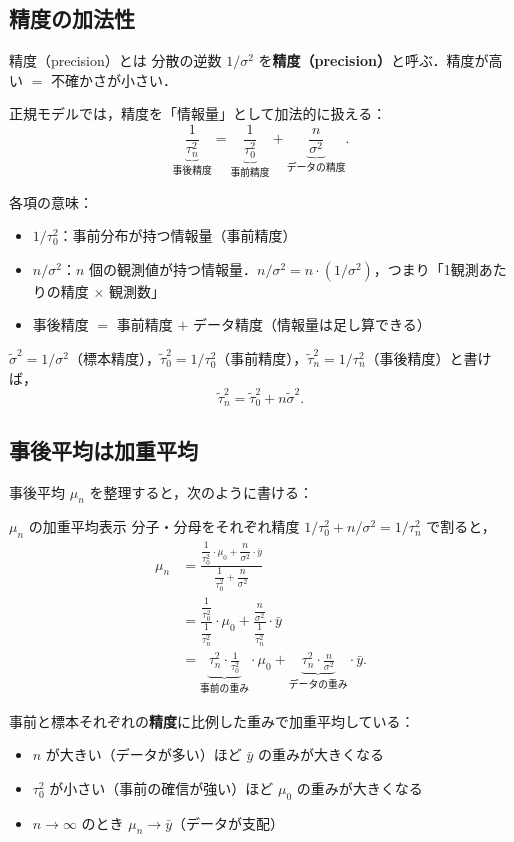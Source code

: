 \documentclass[lualatex,ja=standard,a4paper,12pt]{bxjsarticle}
\begin{document}
\subsection{精度の加法性}

\begin{derivbox}{精度（precision）とは}
分散の逆数 $1/\sigma^2$ を\textbf{精度（precision）}と呼ぶ．精度が高い $=$ 不確かさが小さい．

正規モデルでは，精度を「情報量」として加法的に扱える：
\[
  \underbrace{\frac{1}{\tau_n^2}}_{\text{事後精度}}
  = \underbrace{\frac{1}{\tau_0^2}}_{\text{事前精度}}
  + \underbrace{\frac{n}{\sigma^2}}_{\text{データの精度}}.
\]

各項の意味：
\begin{itemize}
  \item $1/\tau_0^2$：事前分布が持つ情報量（事前精度）
  \item $n/\sigma^2$：$n$ 個の観測値が持つ情報量．$n/\sigma^2 = n \cdot (1/\sigma^2)$，つまり「1観測あたりの精度 $\times$ 観測数」
  \item 事後精度 $=$ 事前精度 $+$ データ精度（情報量は足し算できる）
\end{itemize}

$\tilde{\sigma}^2 = 1/\sigma^2$（標本精度），$\tilde{\tau}_0^2 = 1/\tau_0^2$（事前精度），$\tilde{\tau}_n^2 = 1/\tau_n^2$（事後精度）と書けば，
\[
  \tilde{\tau}_n^2 = \tilde{\tau}_0^2 + n\tilde{\sigma}^2.
\]
\end{derivbox}

\subsection{事後平均は加重平均}

事後平均 $\mu_n$ を整理すると，次のように書ける：

\begin{derivbox}{$\mu_n$ の加重平均表示}
分子・分母をそれぞれ精度 $1/\tau_0^2 + n/\sigma^2 = 1/\tau_n^2$ で割ると，
\begin{align*}
  \mu_n
  &= \frac{\dfrac{1}{\tau_0^2} \cdot \mu_0 + \dfrac{n}{\sigma^2} \cdot \bar{y}}
         {\dfrac{1}{\tau_0^2} + \dfrac{n}{\sigma^2}} \\[6pt]
  &= \frac{\dfrac{1}{\tau_0^2}}{\dfrac{1}{\tau_n^2}} \cdot \mu_0
   + \frac{\dfrac{n}{\sigma^2}}{\dfrac{1}{\tau_n^2}} \cdot \bar{y} \\[6pt]
  &= \underbrace{\tau_n^2 \cdot \frac{1}{\tau_0^2}}_{\text{事前の重み}} \cdot \mu_0
   + \underbrace{\tau_n^2 \cdot \frac{n}{\sigma^2}}_{\text{データの重み}} \cdot \bar{y}.
\end{align*}

\noindent 事前と標本それぞれの\textbf{精度}に比例した重みで加重平均している：
\begin{itemize}
  \item $n$ が大きい（データが多い）ほど $\bar{y}$ の重みが大きくなる
  \item $\tau_0^2$ が小さい（事前の確信が強い）ほど $\mu_0$ の重みが大きくなる
  \item $n \to \infty$ のとき $\mu_n \to \bar{y}$（データが支配）
\end{itemize}
\end{derivbox}
\end{document}
